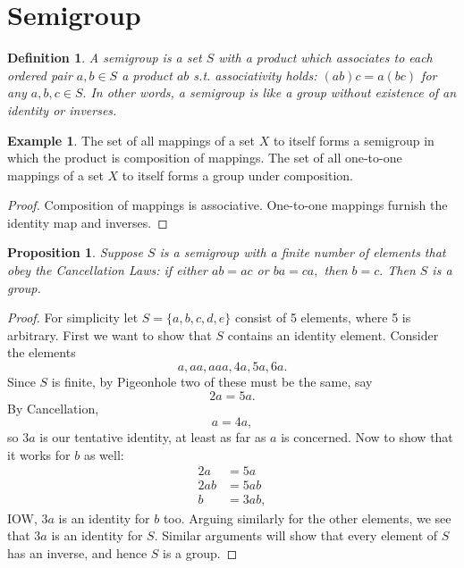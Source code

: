 \documentclass[12pt]{article}
\theoremstyle{plain}
\newtheorem{proposition}[theorem]{Proposition}
\newtheorem{definition}[theorem]{Definition}
\theoremstyle{definition}
\newtheorem{example}[theorem]{Example}
\theoremstyle{remark}
\newcommand{\0}{\varnothing}
\newcommand{\<}{\langle}
\renewcommand{\>}{\rangle}
\begin{document}
\section{Semigroup}

\begin{definition}
A semigroup is a set $ S $ with a product which associates to each ordered pair $ a, b\in S $ a product $ ab $ s.t. associativity holds: $ (ab)c = a(bc) $ for any $ a,b,c \in S. $ In other words, a semigroup is like a group without existence of an identity or inverses.
\end{definition}

\begin{example}
The set of all mappings of a set $ X $ to itself forms a semigroup in which the product is composition of mappings. The set of all one-to-one mappings of a set $ X $ to itself forms a group under composition.
\end{example}

\begin{proof}
Composition of mappings is associative. One-to-one mappings furnish the identity map and inverses.
\end{proof}

\begin{proposition}
Suppose $ S $ is a semigroup with a finite number of elements that obey the Cancellation Laws: if either $ ab = ac $ or $ ba = ca, $ then $ b = c. $ Then $ S $ is a group.
\end{proposition}

\begin{proof}
For simplicity let $ S = \{ a, b, c, d, e \} $ consist of 5 elements, where 5 is arbitrary. First we want to show that $ S $ contains an identity element. Consider the elements \[
a, aa, aaa, 4a, 5a, 6a.
\]
Since $ S $ is finite, by Pigeonhole two of these must be the same, say \[
2a = 5a.
\]
By Cancellation, \[
a = 4a,
\]
so $ 3a $ is our tentative identity, at least as far as $ a $ is concerned. Now to show that it works for $ b $ as well: \begin{align*}
2a &= 5a \\
2a b &= 5a b \\
b &= 3a b,
\end{align*}
IOW, $ 3a $ is an identity for $ b $ too. Arguing similarly for the other elements, we see that $ 3a $ is an identity for $ S. $ Similar arguments will show that every element of $ S $ has an inverse, and hence $ S $ is a group.
\end{proof}
\end{document}
